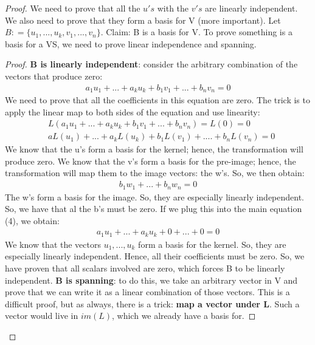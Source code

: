 \documentclass[a4paper, 12pt]{article}
\theoremstyle{definition}
\theoremstyle{definition}
\theoremstyle{definition}
\theoremstyle{definition}
\begin{document}
{\begin{proof}
	We need to prove that all the $u's$ with the $v's$ are linearly independent. We also need to prove that they form a basis for V (more important). 
	\newline 
	\newline
	Let $B : = \{ u_1, ..., u_k, v_1, ..., v_n \}$. Claim: B is a basis for V. To prove something is a basis for a VS, we need to prove linear independence and spanning. 
	\begin{proof}
		\textbf{B is linearly independent}: consider the arbitrary combination of the vectors that produce zero: 
		\begin{align}
			a_1 u_1 + ... + a_k u_k + b_1 v_1 + ... + b_n v_n = 0 
		\end{align}
		We need to prove that all the coefficients in this equation are zero. The trick is to apply the linear map to both sides of the equation and use linearity: 
		\begin{align*}
			& L (a_1 u_1 + ... + a_k u_k + b_1 v_1 + ... + b_n v_n) = L(0) = 0  \\
			& aL(u_1) + ... + a_k L(u_k) + b_1 L(v_1) + .... + b_nL(v_n) = 0 
		\end{align*}
		We know that the u's form a basis for the kernel; hence, the transformation will produce zero. We know that the v's form a basis for the pre-image; hence, the transformation will map them to the image vectors: the w's. So, we then obtain: 
		\begin{align*}
			b_1 w_1 + ... + b_n w_n = 0 
		\end{align*}
		The w's form a basis for the image. So, they are especially linearly independent. So, we have that al the b's must be zero. If we plug this into the main equation (4), we obtain: 
		\begin{align*}
			a_1 u_1 + ... + a_k u_k + 0 + ... + 0 = 0 
		\end{align*}
		We know that the vectors $u_1, ..., u_k$ form a basis for the kernel. So, they are especially linearly independent. Hence, all their coefficients must be zero. So, we have proven that all scalars involved are zero, which forces B to be linearly independent. 
		\newline 
		\newline
		\textbf{B is spanning}: to do this, we take an arbitrary vector in V and prove that we can write it as a linear combination of those vectors. This is a difficult proof, but as always, there is a trick: \textbf{map a vector under L}. Such a vector would live in $im(L)$, which we already have a basis for. 

\end{proof}
\end{proof}}
\end{document}
